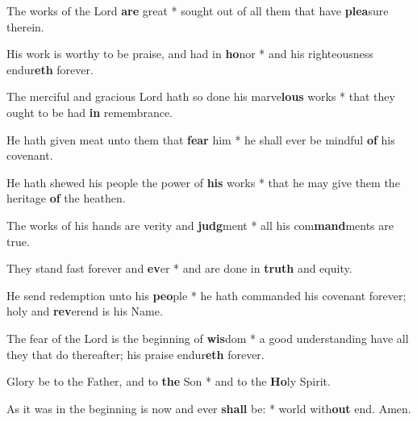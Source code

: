\begin{multicols}{2}
	The works of the Lord \textbf{are} great * sought out of all them that have \textbf{plea}sure therein.
	
	His work is worthy to be praise, and had in \textbf{ho}nor * and his righteousness endur\textbf{eth} forever.
	
	The merciful and gracious Lord hath so done his marve\textbf{lous} works * that they ought to be had \textbf{in} remembrance.
	
	He hath given meat unto them that \textbf{fear} him * he shall ever be mindful \textbf{of} his covenant.
	
	He hath shewed his people the power of \textbf{his} works * that he may give them the heritage \textbf{of} the heathen.
	
	The works of his hands are verity and \textbf{judg}ment * all his com\textbf{mand}ments are true.
	
	They stand fast forever and \textbf{ev}er * and are done in \textbf{truth} and equity.
	
	He send redemption unto his \textbf{peo}ple * he hath commanded his covenant forever; holy and \textbf{rev}erend is his Name.
	
	The fear of the Lord is the beginning of \textbf{wis}dom * a good understanding have all they that do thereafter; his praise endur\textbf{eth} forever.
	
	Glory be to the Father, and to \textbf{the} Son * and to the \textbf{Ho}ly Spirit.
	
	As it was in the beginning is now and ever \textbf{shall} be: * world with\textbf{out} end. Amen.
\end{multicols}